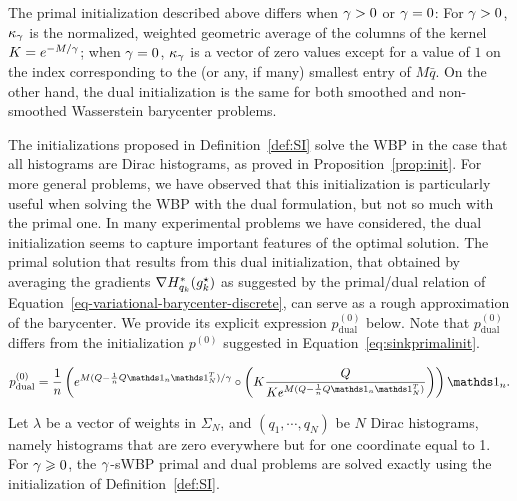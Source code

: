 The primal initialization described above differs when $\gamma>0$ or $\gamma=0$: For $\gamma>0$, $\kappa_\gamma$ is the normalized, weighted geometric average of the columns of the kernel $K=e^{-M/\gamma}$; when $\gamma=0$, $\kappa_\gamma$ is a vector of zero values except for a value of $1$ on the index corresponding to the (or any, if many) smallest entry of $M\bar{q}$. On the other hand, the dual initialization is the same for both smoothed and non-smoothed Wasserstein barycenter problems.

The initializations proposed in Definition~\ref{def:SI} solve the WBP in the case that all histograms are Dirac histograms, as proved in Proposition~\ref{prop:init}. For more general problems, we have observed that this initialization is particularly useful when solving the WBP with the dual formulation, but not so much with the primal one. In many experimental problems we have considered, the dual initialization seems to capture important features of the optimal solution. The primal solution that results from this dual initialization, that obtained by averaging the gradients $\nabla H_{q_k}^*(g_k^\star)$ as suggested by the primal/dual relation of Equation~\eqref{eq-variational-barycenter-discrete}, can serve as a rough approximation of the barycenter. We provide its explicit expression $p^{(0)}_{\text{dual}}$ below. Note that $p^{(0)}_{\text{dual}}$ differs from the initialization $p^{(0)}$ suggested in Equation~\eqref{eq:sinkprimalinit}.

$$p^{(0)}_{\text{dual}} = \frac{1}{n} \left(e^{M(Q-\frac{1}{n}Q\ones_n\ones_N^T)/\ga}\circ \left(K\frac{Q}{Ke^{M(Q-\frac{1}{n}Q\ones_n\ones_N^T)}}\right)\right)\ones_n.$$

\begin{proposition}\label{prop:init} Let $\lambda$ be a vector of weights in $\Sigma_N$, and $(q_1,\cdots,q_N)$ be $N$ Dirac histograms, namely histograms that are zero everywhere but for one coordinate equal to 1. For $\gamma\geqslant 0$, the $\gamma$-sWBP primal and dual problems are solved exactly using the initialization of Definition~\eqref{def:SI}.
\end{proposition}

